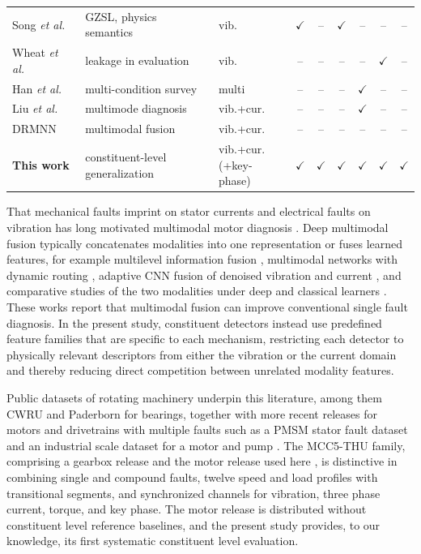 \documentclass{ieeeaccess}
\begin{document}
\begin{table}[!t]
\begin{tabular}{l l l c c c c c c}
Song \emph{et al.} \cite{song2025gzsl} & GZSL, physics semantics & vib. & $\checkmark$ & -- & $\checkmark$ & -- & -- & -- \\
Wheat \emph{et al.} \cite{wheat2024} & leakage in evaluation & vib. & -- & -- & -- & -- & $\checkmark$ & -- \\
Han \emph{et al.} \cite{han2025} & multi-condition survey & multi & -- & -- & -- & $\checkmark$ & -- & -- \\
Liu \emph{et al.} \cite{liu2024tii} & multimode diagnosis & vib.+cur. & -- & -- & -- & $\checkmark$ & -- & -- \\
DRMNN \cite{drmnn2020} & multimodal fusion & vib.+cur. & -- & -- & -- & -- & -- & -- \\
\textbf{This work} & \makecell[l]{constituent-level\\generalization} &
\makecell[l]{vib.+cur.\\(+key-phase)} & $\checkmark$ & $\checkmark$ &
$\checkmark$ & $\checkmark$ & $\checkmark$ & $\checkmark$ \\
\hline
\end{tabular}
\end{table}

That mechanical faults imprint on stator currents and electrical faults on
vibration has long motivated multimodal motor diagnosis
\cite{thomson2001mcsa,nandi2005review,bellini2008advances,mcsa_review2017}.
Deep multimodal fusion typically concatenates modalities into one
representation or fuses learned features, for example multilevel information
fusion \cite{multilevel2019}, multimodal networks with dynamic routing
\cite{drmnn2020}, adaptive CNN fusion of denoised vibration and current
\cite{plos2025}, and comparative studies of the two modalities under deep and
classical learners \cite{ayankoso2026}. These works report that multimodal
fusion can improve conventional single fault diagnosis. In the present study,
constituent detectors instead use predefined feature families that are
specific to each mechanism, restricting each detector to physically relevant
descriptors from either the vibration or the current domain and thereby
reducing direct competition between unrelated modality features.

Public datasets of rotating machinery underpin this literature, among them
CWRU \cite{smith2015cwru} and Paderborn \cite{lessmeier2016} for bearings,
together with more recent releases for motors and drivetrains with multiple
faults such as a PMSM stator fault dataset \cite{jung2023} and an industrial
scale dataset for a motor and pump \cite{bruinsma2024}. The MCC5-THU family,
comprising a gearbox release \cite{chen2024gearbox} and the motor release
used here \cite{chen2026}, is distinctive in combining single and compound
faults, twelve speed and load profiles with transitional segments, and
synchronized channels for vibration, three phase current, torque, and key
phase. The motor release is distributed without constituent level reference
baselines, and the present study provides, to our knowledge, its first
systematic constituent level evaluation.
\end{document}
